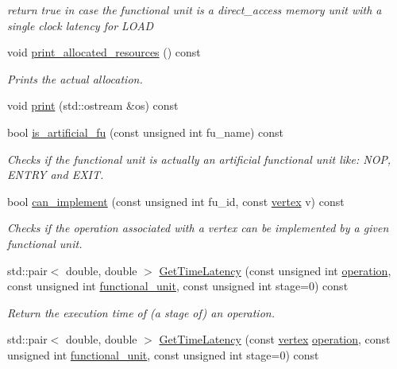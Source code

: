 \begin{DoxyCompactItemize}
\begin{DoxyCompactList}\small\item\em return true in case the functional unit is a direct\+\_\+access memory unit with a single clock latency for L\+O\+AD \end{DoxyCompactList}\item 
void \hyperlink{classAllocationInformation_a9ecf70563f77983034205f506e59728a}{print\+\_\+allocated\+\_\+resources} () const
\begin{DoxyCompactList}\small\item\em Prints the actual allocation. \end{DoxyCompactList}\item 
void \hyperlink{classAllocationInformation_ad6f604848ae5eac8768c95cb9e7e4e49}{print} (std\+::ostream \&os) const
\item 
bool \hyperlink{classAllocationInformation_af4a69fd5612c7c12cd0fa2b55d18d9c5}{is\+\_\+artificial\+\_\+fu} (const unsigned int fu\+\_\+name) const
\begin{DoxyCompactList}\small\item\em Checks if the functional unit is actually an artificial functional unit like\+: N\+OP, E\+N\+T\+RY and E\+X\+IT. \end{DoxyCompactList}\item 
bool \hyperlink{classAllocationInformation_a09aeaf5be6c6e2bcafa1b358dfa287cc}{can\+\_\+implement} (const unsigned int fu\+\_\+id, const \hyperlink{graph_8hpp_abefdcf0544e601805af44eca032cca14}{vertex} v) const
\begin{DoxyCompactList}\small\item\em Checks if the operation associated with a vertex can be implemented by a given functional unit. \end{DoxyCompactList}\item 
std\+::pair$<$ double, double $>$ \hyperlink{classAllocationInformation_a9958c6919a34a32bd500f4b8470d8b85}{Get\+Time\+Latency} (const unsigned int \hyperlink{structoperation}{operation}, const unsigned int \hyperlink{structfunctional__unit}{functional\+\_\+unit}, const unsigned int stage=0) const
\begin{DoxyCompactList}\small\item\em Return the execution time of (a stage of) an operation. \end{DoxyCompactList}\item 
std\+::pair$<$ double, double $>$ \hyperlink{classAllocationInformation_a040ec5fdf120433b32443c08d73b57ef}{Get\+Time\+Latency} (const \hyperlink{graph_8hpp_abefdcf0544e601805af44eca032cca14}{vertex} \hyperlink{structoperation}{operation}, const unsigned int \hyperlink{structfunctional__unit}{functional\+\_\+unit}, const unsigned int stage=0) const

\end{DoxyCompactItemize}
